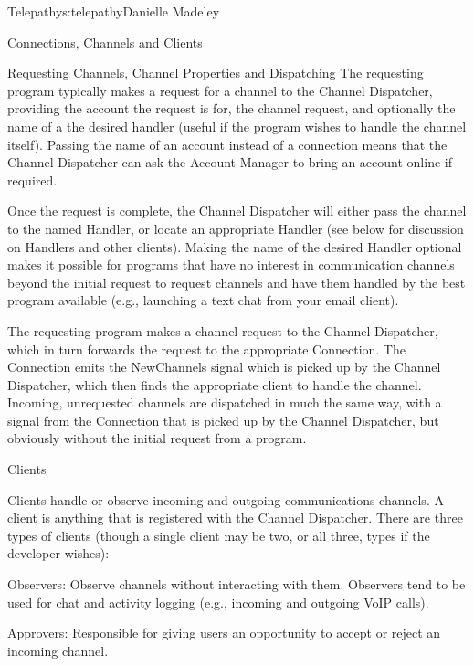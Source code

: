 \begin{aosachapter}{Telepathy}{s:telepathy}{Danielle Madeley}
\begin{aosasect1}{Connections, Channels and Clients}
\begin{aosasect2}{Requesting Channels, Channel Properties and Dispatching}
The requesting program typically makes a request for a channel to the
Channel Dispatcher, providing the account the request is for, the
channel request, and optionally the name of a the desired handler
(useful if the program wishes to handle the channel itself).  Passing
the name of an account instead of a connection means that the Channel
Dispatcher can ask the Account Manager to bring an account online if
required.

Once the request is complete, the Channel Dispatcher will either pass
the channel to the named Handler, or locate an appropriate Handler
(see below for discussion on Handlers and other clients). Making the
name of the desired Handler optional makes it possible for programs
that have no interest in communication channels beyond the initial
request to request channels and have them handled by the best program
available (e.g., launching a text chat from your email client).


The requesting program makes a channel request to the Channel
Dispatcher, which in turn forwards the request to the appropriate
Connection. The Connection emits the NewChannels signal which is
picked up by the Channel Dispatcher, which then finds the appropriate
client to handle the channel.  Incoming, unrequested channels are
dispatched in much the same way, with a signal from the Connection
that is picked up by the Channel Dispatcher, but obviously without the
initial request from a program.

\end{aosasect2}

\begin{aosasect2}{Clients}

Clients handle or observe incoming and outgoing communications
channels. A client is anything that is registered with the Channel
Dispatcher.  There are three types of clients (though a single client
may be two, or all three, types if the developer wishes):

\begin{aosadescription}

  \item{Observers}: Observe channels without interacting with
    them. Observers tend to be used for chat and activity logging
    (e.g., incoming and outgoing VoIP calls).

  \item{Approvers}: Responsible for giving users an opportunity to
    accept or reject an incoming channel.


\end{aosadescription}
\end{aosasect2}
\end{aosasect1}
\end{aosachapter}
